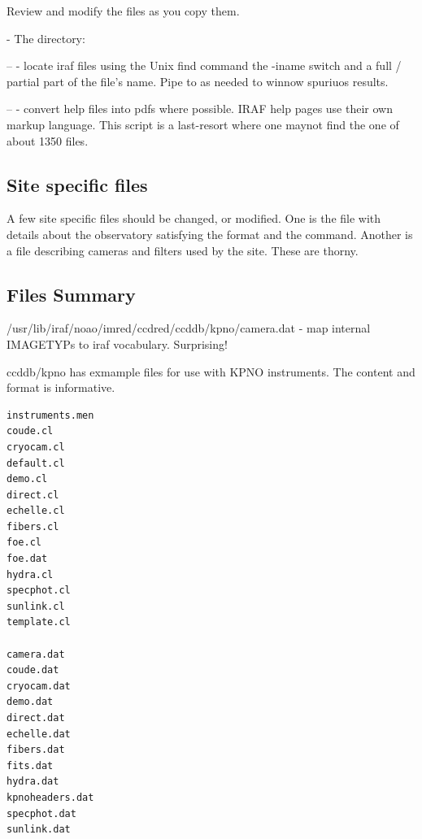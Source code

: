 Review and modify the  files as you copy them.

- The  directory:

  --  - locate iraf files using the Unix find command the -iname
     switch and a full / partial part of the file's name. Pipe to 
     as needed to winnow spuriuos results.

  --  - convert help files into pdfs where possible. IRAF help pages
     use their own markup language. This script is a last-resort where one maynot
     find the one of about 1350  files.

\subsection{Site specific files}

A few site specific files should be changed, or modified. One is the
 file with details about the observatory satisfying the
 format and the  command.
Another is a file describing cameras and filters used by the site. These
are thorny.



\subsection{Files Summary}

/usr/lib/iraf/noao/imred/ccdred/ccddb/kpno/camera.dat - map internal IMAGETYPs
to iraf vocabulary. Surprising! 

ccddb/kpno has exmample files for use with KPNO instruments. The
content and format is informative.

\begingroup \fontsize{10pt}{10pt}
\selectfont
\begin{verbatim} 
instruments.men
coude.cl
cryocam.cl
default.cl
demo.cl
direct.cl
echelle.cl
fibers.cl
foe.cl
foe.dat
hydra.cl
specphot.cl
sunlink.cl
template.cl

camera.dat
coude.dat
cryocam.dat
demo.dat
direct.dat
echelle.dat
fibers.dat
fits.dat
hydra.dat
kpnoheaders.dat
specphot.dat
sunlink.dat

\end{verbatim}
\endgroup


